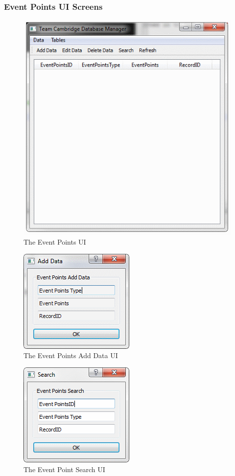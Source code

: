 \subsubsection{Event Points UI Screens}

\begin{figure}[H]
\includegraphics{./Maintenance/UI/EventPoints.png}
\caption{The Event Points UI} \label{fig:EventPoints_UI}
\end{figure}

\begin{figure}[H]
\includegraphics{./Maintenance/UI/EventPointsAD.png}
\caption{The Event Points Add Data UI} \label{fig:EventPointsAD_UI}
\end{figure}

\begin{figure}[H]
\includegraphics{./Maintenance/UI/EventPointsSearch.png}
\caption{The Event Point Search UI} \label{fig:EventPointsSearch_UI}
\end{figure}



